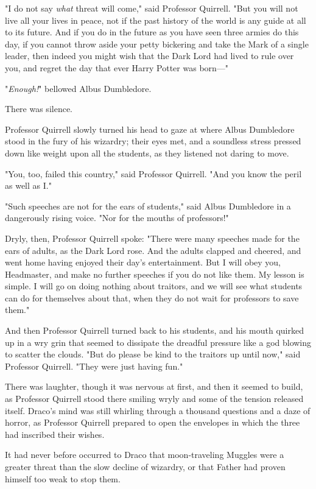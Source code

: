 "I do not say \emph{what} threat will come," said Professor Quirrell. "But you 
will not live all your lives in peace, not if the past history of the world is 
any guide at all to its future. And if you do in the future as you have seen 
three armies do this day, if you cannot throw aside your petty bickering and 
take the Mark of a single leader, then indeed you might wish that the Dark Lord 
had lived to rule over you, and regret the day that ever Harry Potter was 
born---"

"\emph{Enough!}" bellowed Albus Dumbledore.

There was silence.

Professor Quirrell slowly turned his head to gaze at where Albus Dumbledore 
stood in the fury of his wizardry; their eyes met, and a soundless stress 
pressed down like weight upon all the students, as they listened not daring to 
move.

"You, too, failed this country," said Professor Quirrell. "And you know the 
peril as well as I."

"Such speeches are not for the ears of students," said Albus Dumbledore in a 
dangerously rising voice. "Nor for the mouths of professors!"

Dryly, then, Professor Quirrell spoke: "There were many speeches made for the 
ears of adults, as the Dark Lord rose. And the adults clapped and cheered, and 
went home having enjoyed their day's entertainment. But I will obey you, 
Headmaster, and make no further speeches if you do not like them. My lesson is 
simple. I will go on doing nothing about traitors, and we will see what 
students can do for themselves about that, when they do not wait for professors 
to save them."

And then Professor Quirrell turned back to his students, and his mouth quirked 
up in a wry grin that seemed to dissipate the dreadful pressure like a god 
blowing to scatter the clouds. "But do please be kind to the traitors up until 
now," said Professor Quirrell. "They were just having fun."

There was laughter, though it was nervous at first, and then it seemed to 
build, as Professor Quirrell stood there smiling wryly and some of the tension 
released itself.
\sbreak
Draco's mind was still whirling through a thousand questions and a daze of 
horror, as Professor Quirrell prepared to open the envelopes in which the three 
had inscribed their wishes.

It had never before occurred to Draco that moon-traveling Muggles were a 
greater threat than the slow decline of wizardry, or that Father had proven 
himself too weak to stop them.

